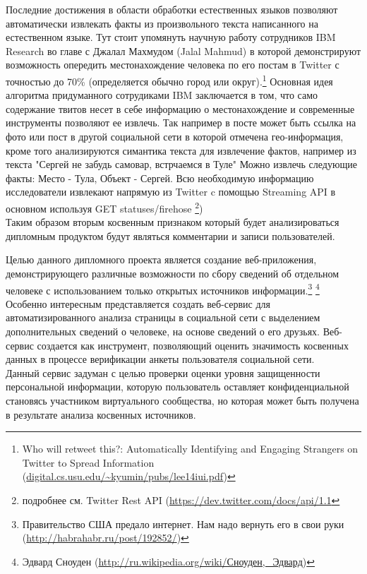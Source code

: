 Последние достижения в области обработки естественных языков позволяют автоматически извлекать факты из произвольного текста написанного на естественном языке. Тут стоит упомянуть научную работу сотрудников IBM Research во главе с Джалал Махмудом (Jalal Mahmud) в которой демонстрируют возможность опередить местонахождение человека по его постам в Twitter с точностью до 70\% (определяется обычно город или округ).\footnote{Who will retweet this?: Automatically Identifying and Engaging Strangers on Twitter to Spread Information (\url{digital.cs.usu.edu/~kyumin/pubs/lee14iui.pdf‎})}
 Основная идея алгоритма придуманного сотрудиками IBM заключается в том, что само содержание твитов несет в себе информацию о местонахождение и современные  инструменты  позволяют ее извлечь. Так например в посте может быть ссылка на фото или пост в другой социальной сети в которой отмечена гео-информация, кроме того анализируются симантика текста для извлечение фактов, например из текста "Сергей не забудь самовар, встрчаемся в Туле" Можно извлечь следующие факты: Место - Тула, Объект - Сергей. Всю необходимую информацию исследователи извлекают напрямую из Twitter c помощью Streaming API в основном используя GET statuses/firehose \footnote{подробнее см. Twitter Rest API (\url{https://dev.twitter.com/docs/api/1.1}})\\ Таким образом вторым косвенным признаком который будет анализироваться дипломным продуктом будут являться комментарии и записи пользователей.


Целью данного дипломного проекта является создание веб-приложения, демонстрирующего различные возможности по сбору сведений об отдельном человеке с использованием только открытых источников информации.\footnote{Правительство США предало интернет. Нам надо вернуть его в свои руки (\url{http://habrahabr.ru/post/192852/})} \footnote{Эдвард Сноуден (\url{http://ru.wikipedia.org/wiki/Сноуден,\_Эдвард})}
Особенно интересным представляется создать веб-сервис для автоматизированного анализа страницы в социальной сети с выделением дополнительных сведений о человеке, на основе сведений о его друзьях. Веб-сервис создается как инструмент, позволяющий оценить значимость косвенных данных в процессе верификации  анкеты пользователя социальной сети.\\

Данный сервис задуман с целью проверки оценки уровня защищенности персональной информации, которую пользователь оставляет конфиденциальной становясь участником виртуального сообщества, но которая может быть получена в результате анализа косвенных источников.%
\\

